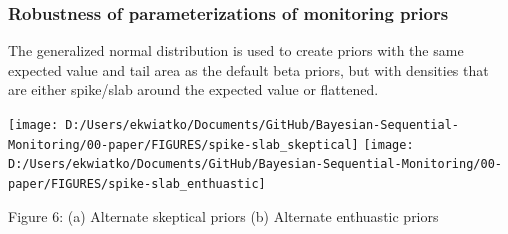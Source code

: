\documentclass[12pt]{article}
\begin{document}
\newpage
\subsubsection{Robustness of parameterizations of monitoring priors}
The generalized normal distribution is used to create priors with the same expected value and tail area as the default beta priors, but with densities that are either spike/slab around the expected value or flattened.
\begin{center}
\texttt{[image: D:/Users/ekwiatko/Documents/GitHub/Bayesian-Sequential-Monitoring/00-paper/FIGURES/spike-slab\_skeptical]}
\texttt{[image: D:/Users/ekwiatko/Documents/GitHub/Bayesian-Sequential-Monitoring/00-paper/FIGURES/spike-slab\_enthuastic]}

Figure 6: (a) Alternate skeptical priors (b) Alternate enthuastic priors
\end{center}
\newpage
\end{document}

